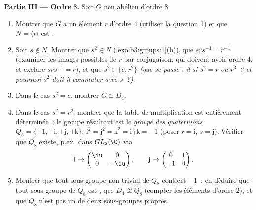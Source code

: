 \begin{problem}
\medskip
\noindent\textbf{Partie III --- Ordre $8$.} Soit $G$ non abélien
d'ordre $8$.
\begin{enumerate}[resume]
  \item Montrer que $G$ a un élément $r$ d'ordre $4$ (utiliser la
        question 1) et que $N = \langle r\rangle$ est .
  \item Soit $s \notin N$. Montrer que $s^2 \in N$
        (\cref{exo:b3:groups:1}(b)), que $srs^{-1} = r^{-1}$
        (examiner les images possibles de $r$ par conjugaison,
        qui doivent avoir ordre 4, et exclure $srs^{-1} = r$), et
        que $s^2 \in \{e, r^2\}$ \emph{(que se passe-t-il si $s^2
        = r$ ou $r^3$~? et pourquoi $s^2$ doit-il commuter avec
        $s$~?)}.
  \item Dans le cas $s^2 = e$, montrer $G \cong D_4$.
  \item Dans le cas $s^2 = r^2$, montrer que la table de
        multiplication est entièrement déterminée~; le groupe
        résultant est le \emph{groupe des
        quaternions} $Q_8 = \{\pm
        1, \pm \mathrm i, \pm \mathrm j, \pm \mathrm k\}$,
        $\mathrm i^2 = \mathrm j^2 = \mathrm k^2 = \mathrm i\,
        \mathrm j\,\mathrm k = -1$ (poser $r = \mathrm i$, $s =
        \mathrm j$). Vérifier que $Q_8$ existe, p.ex.\ dans
        $GL_2(\C)$ via
        \[
        \mathrm i \mapsto \begin{pmatrix} \iu & 0\\ 0 & -\iu
        \end{pmatrix},
        \qquad
        \mathrm j \mapsto \begin{pmatrix} 0 & 1\\ -1 & 0
        \end{pmatrix}.
        \]
  \item Montrer que tout sous-groupe non trivial de $Q_8$ contient
        $-1$~; en déduire que tout sous-groupe de $Q_8$ est
        , que $D_4 \not\cong Q_8$ (compter les éléments
        d'ordre $2$), et que $Q_8$ n'est pas un  de deux sous-groupes propres.
\end{enumerate}


\end{problem}

